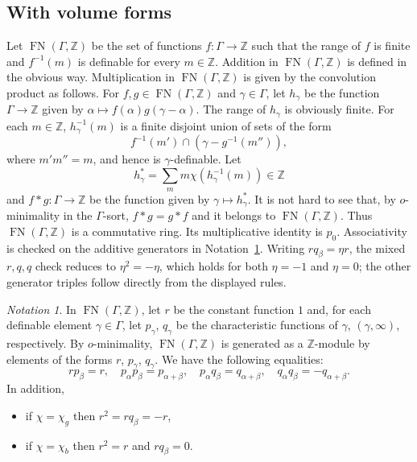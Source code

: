 \documentclass[12pt]{amsart}
\theoremstyle{plain}
\theoremstyle{definition}
\theoremstyle{remark}
\newtheorem{nota}[thm]{Notation}
\numberwithin{equation}{section}
\theoremstyle{plain}
\newcommand{\Z}{\mathds{Z}}
\newcommand{\omin}{$o$\nobreakdash}
\newcommand{\0}{\emptyset}
\newcommand{\fun}{\longrightarrow}
\newcommand{\efun}{\longmapsto}
\DeclareMathOperator{\fn}{FN}
\begin{document}
\subsection{With volume forms}
Let $\fn(\Gamma, \Z)$ be the set of functions $f: \Gamma \fun \Z$ such that the range of $f$ is finite and $f^{-1}(m)$ is definable for every $m \in \Z$. Addition in $\fn(\Gamma, \Z)$ is defined in the obvious way. Multiplication in $\fn(\Gamma, \Z)$ is given by the convolution product as follows. For $f, g \in \fn(\Gamma, \Z)$ and $\gamma \in \Gamma$, let $h_\gamma$ be the function $\Gamma \fun \Z$ given by $\alpha \efun f(\alpha)g(\gamma - \alpha)$. The range of $h_\gamma$ is obviously finite. For each $m \in \Z$, $h_\gamma^{-1}(m)$ is a finite disjoint union of sets of the form
\[
f^{-1}(m') \cap (\gamma - g^{-1}(m'')),
\]
where $m' m'' = m$, and hence is $\gamma$-definable. Let
\[
 h_\gamma^* = \sum_{m} m \chi(h_\gamma^{-1}(m)) \in \Z
\]
and $f * g : \Gamma \fun \Z$ be the function  given by $\gamma \efun h_\gamma^*$. It is not hard to see that, by \omin-minimality in the $\Gamma$-sort, $f * g = g * f$ and it belongs to $\fn(\Gamma, \Z)$. Thus $\fn(\Gamma, \Z)$ is a commutative ring. Its multiplicative identity is $p_0$. Associativity is checked on the additive generators in Notation~\ref{gam:equ:cons}. Writing $rq_\beta=\eta r$, the mixed $r,q,q$ check reduces to $\eta^2=-\eta$, which holds for both $\eta=-1$ and $\eta=0$; the other generator triples follow directly from the displayed rules.


\begin{nota}\label{gam:equ:cons}
In $\fn(\Gamma, \Z)$, let $r$ be the constant function $1$ and, for each definable element $\gamma \in \Gamma$, let $p_{\gamma}$,  $q_{\gamma}$ be the characteristic functions of $\gamma$, $(\gamma, \infty)$, respectively. By \omin-minimality, $\fn(\Gamma, \Z)$ is generated as a $\Z$-module by elements of the forms $r$, $p_\gamma$, $q_\gamma$. We have the following equalities:
\[
r p_\beta   = r, \quad p_\alpha p_\beta = p_{\alpha+ \beta}, \quad p_\alpha q_\beta  = q_{\alpha+ \beta}, \quad q_\alpha q_\beta = - q_{\alpha+ \beta}.
\]
In addition,
\begin{itemize}
  \item if $\chi = \chi_{g}$ then $r^2 = r q_\beta = - r$,
  \item if $\chi = \chi_{b}$ then $r^2 = r$ and $r q_\beta = 0$.
\end{itemize}
\end{nota}
\end{document}
